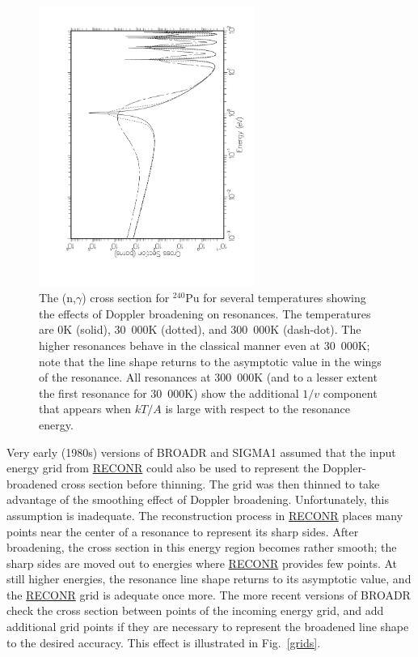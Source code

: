 \begin{figure}[thbp]\centering
\includegraphics[keepaspectratio, height=3.6in, angle=270]{figs/broadr3ack}
\caption[The $^{240}$Pu low energy (n,$\gamma$) cross section versus Doppler
 broadening temperature]
{The (n,$\gamma$) cross section for
 $^{240}$Pu for several temperatures showing
 the effects of Doppler broadening on resonances.  The
 temperatures are 0K (solid), 30\ 000K (dotted), and
 300\ 000K (dash-dot).  The higher resonances behave in
 the classical manner even at 30\ 000K; note that the
 line shape returns to the asymptotic value in the wings
 of the resonance.  All resonances at 300\ 000K (and to a
 lesser extent the first resonance for 30\ 000K) show the
 additional $1/v$ component that appears when $kT/A$ is
 large with respect to the resonance energy.}
   \label{reson}
\end{figure}

Very early (1980s) versions of BROADR and SIGMA1 assumed that the input
energy grid from \hyperlink{sRECONRhy}{RECONR}
could also be used to represent
the Doppler-broadened cross section before thinning.  The grid was
then thinned to take advantage of the smoothing effect of Doppler
broadening.  Unfortunately, this assumption is inadequate.  The
reconstruction process in \hyperlink{sRECONRhy}{RECONR} places many points
near the center of a resonance to represent its sharp sides.  After
broadening, the cross section in this energy region becomes
rather smooth;  the sharp sides are moved out to energies where
\hyperlink{sRECONRhy}{RECONR} provides few points.  At still higher energies,
the resonance line shape returns to its asymptotic value, and the
\hyperlink{sRECONRhy}{RECONR} grid is adequate once more.  The more recent
versions of BROADR check the cross section between points of the incoming
energy grid, and add additional grid points if they are necessary
to represent the broadened line shape to the desired accuracy.
This effect is illustrated in Fig.~\ref{grids}.

